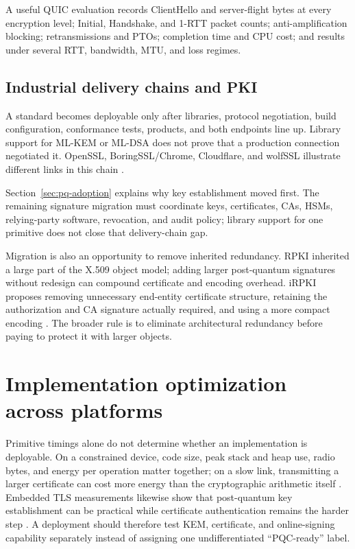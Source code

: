 A useful QUIC evaluation records ClientHello and server-flight bytes at every
encryption level; Initial, Handshake, and 1-RTT packet counts; anti-amplification
blocking; retransmissions and PTOs; completion time and CPU cost; and results under
several RTT, bandwidth, MTU, and loss regimes.

\subsection{Industrial delivery chains and PKI}

A standard becomes deployable only after libraries, protocol negotiation, build
configuration, conformance tests, products, and both endpoints line up. Library
support for ML-KEM or ML-DSA does not prove that a production connection negotiated
it. OpenSSL, BoringSSL/Chrome, Cloudflare, and wolfSSL illustrate different links
in this chain \cite{opensslpq2026,chromekyber2024,cloudflarepqmigration2026,wolfsslpq}.

Section~\ref{sec:pq-adoption} explains why key establishment moved first. The
remaining signature migration must coordinate keys, certificates, CAs, HSMs,
relying-party software, revocation, and audit policy; library support for one
primitive does not close that delivery-chain gap.

Migration is also an opportunity to remove inherited redundancy. RPKI inherited a
large part of the X.509 object model; adding larger post-quantum signatures without
redesign can compound certificate and encoding overhead. iRPKI proposes removing
unnecessary end-entity certificate structure, retaining the authorization and CA
signature actually required, and using a more compact encoding \cite{irpki2026}.
The broader rule is to eliminate architectural redundancy before paying to protect
it with larger objects.

\section{Implementation optimization across platforms}

Primitive timings alone do not determine whether an implementation is deployable.
On a constrained device, code size, peak stack and heap use, radio bytes, and energy
per operation matter together; on a slow link, transmitting a larger certificate
can cost more energy than the cryptographic arithmetic itself
\cite{pqciotsurvey2024}. Embedded TLS measurements likewise show that post-quantum
key establishment can be practical while certificate authentication remains the
harder step \cite{pqtlsembedded2020}. A deployment should therefore test KEM,
certificate, and online-signing capability separately instead of assigning one
undifferentiated ``PQC-ready'' label.

